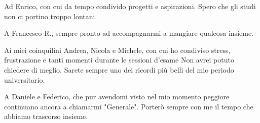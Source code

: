 Ad Enrico, con cui da tempo condivido progetti e aspirazioni. Spero che gli studi non ci portino troppo lontani.

A Francesco R., sempre pronto ad accompagnarmi a mangiare qualcosa insieme.

Ai miei coinquilini Andrea, Nicola e Michele, con cui ho condiviso stress, frustrazione e tanti momenti durante le sessioni d'esame Non avrei potuto chiedere di meglio. Sarete sempre uno dei ricordi più belli del mio periodo universitario.

A Daniele e Federico, che pur avendomi visto nel mio momento peggiore continuano ancora a chiamarmi "Generale". Porterò sempre con me il tempo che abbiamo trascorso insieme.
    